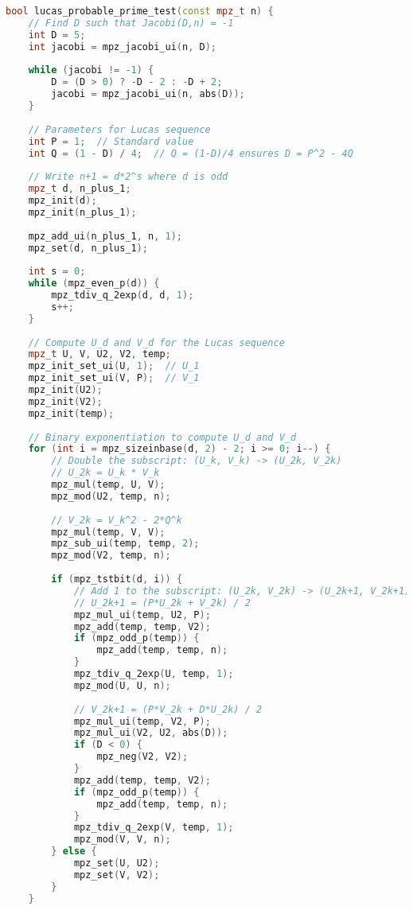 \begin{lstlisting}[language=C++, caption=Strong Lucas Probable Prime Test]
bool lucas_probable_prime_test(const mpz_t n) {
    // Find D such that Jacobi(D,n) = -1
    int D = 5;
    int jacobi = mpz_jacobi_ui(n, D);
    
    while (jacobi != -1) {
        D = (D > 0) ? -D - 2 : -D + 2;
        jacobi = mpz_jacobi_ui(n, abs(D));
    }
    
    // Parameters for Lucas sequence
    int P = 1;  // Standard value
    int Q = (1 - D) / 4;  // Q = (1-D)/4 ensures D = P^2 - 4Q
    
    // Write n+1 = d*2^s where d is odd
    mpz_t d, n_plus_1;
    mpz_init(d);
    mpz_init(n_plus_1);
    
    mpz_add_ui(n_plus_1, n, 1);
    mpz_set(d, n_plus_1);
    
    int s = 0;
    while (mpz_even_p(d)) {
        mpz_tdiv_q_2exp(d, d, 1);
        s++;
    }
    
    // Compute U_d and V_d for the Lucas sequence
    mpz_t U, V, U2, V2, temp;
    mpz_init_set_ui(U, 1);  // U_1
    mpz_init_set_ui(V, P);  // V_1
    mpz_init(U2);
    mpz_init(V2);
    mpz_init(temp);
    
    // Binary exponentiation to compute U_d and V_d
    for (int i = mpz_sizeinbase(d, 2) - 2; i >= 0; i--) {
        // Double the subscript: (U_k, V_k) -> (U_2k, V_2k)
        // U_2k = U_k * V_k
        mpz_mul(temp, U, V);
        mpz_mod(U2, temp, n);
        
        // V_2k = V_k^2 - 2*Q^k
        mpz_mul(temp, V, V);
        mpz_sub_ui(temp, temp, 2);
        mpz_mod(V2, temp, n);
        
        if (mpz_tstbit(d, i)) {
            // Add 1 to the subscript: (U_2k, V_2k) -> (U_2k+1, V_2k+1)
            // U_2k+1 = (P*U_2k + V_2k) / 2
            mpz_mul_ui(temp, U2, P);
            mpz_add(temp, temp, V2);
            if (mpz_odd_p(temp)) {
                mpz_add(temp, temp, n);
            }
            mpz_tdiv_q_2exp(U, temp, 1);
            mpz_mod(U, U, n);
            
            // V_2k+1 = (P*V_2k + D*U_2k) / 2
            mpz_mul_ui(temp, V2, P);
            mpz_mul_ui(V2, U2, abs(D));
            if (D < 0) {
                mpz_neg(V2, V2);
            }
            mpz_add(temp, temp, V2);
            if (mpz_odd_p(temp)) {
                mpz_add(temp, temp, n);
            }
            mpz_tdiv_q_2exp(V, temp, 1);
            mpz_mod(V, V, n);
        } else {
            mpz_set(U, U2);
            mpz_set(V, V2);
        }
    }
    

\end{lstlisting}
